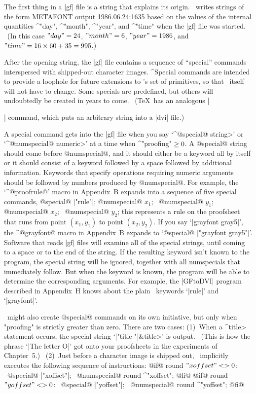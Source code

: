 \smallskip
The first thing in a |gf| file is a string that explains its origin.
\MF\ writes strings of the form
\begintt
METAFONT output 1986.06.24:1635
\endtt
based on the values of the internal quantities ^"day", ^"month",
^"year", and ^"time" when the |gf| file was started. \ (In this case
$"day"=24$, $"month"=6$, $"year"=1986$, %
and $"time"=16\times60+35=995$.)

After the opening string, the |gf| file contains a sequence of
``special'' commands interspersed with shipped-out character images.
^{Special commands} are intended to provide a loophole for future
extensions to \MF's set of primitives, so that \MF\ itself will not
have to change. Some specials are predefined, but others will
undoubtedly be created in years to come. \ (\TeX\ has an analogous
|\special| command, which puts an arbitrary string into a |dvi| file.)

A special command gets into the |gf| file when you say `^@special@
\<string>' or `^@numspecial@ \<numeric>' at a time when
^"proofing"$\null\ge0$.  A @special@ string should come before
@numspecial@, and it
should either be a keyword all by itself or it should consist of a keyword
followed by a space followed by additional information. Keywords that
specify operations requiring numeric arguments should be followed by
numbers produced by @numspecial@. For example, the `^@proofrule@' macro
in Appendix~B expands into a sequence of five special commands,
\begindisplay
@special@ |"rule"|;\cr
@numspecial@ $x_1$; \ @numspecial@ $y_1$;\cr
@numspecial@ $x_2$; \ @numspecial@ $y_2$;\cr
\enddisplay
this represents a rule on the proofsheet that runs from point $(x_1,y_1)$
to point $(x_2,y_2)$. If you say `|grayfont gray5|', the ^@grayfont@
macro in Appendix~B expands to `@special@ |"grayfont gray5"|'.
Software that reads |gf| files will examine all of the special strings,
until coming to a space or to the end of the string. If the resulting
keyword isn't known to the program, the special string will be ignored,
together with all numspecials that immediately follow. But when the
keyword is known, the program will be able to determine the corresponding
arguments.  For example, the |GFtoDVI| program described in Appendix~H
knows about the plain \MF\ keywords `|rule|' and `|grayfont|'.

\MF\ might also create @special@ commands on its own initiative, but only
when "proofing" is strictly greater than zero. There are
two cases: (1)~When a ^\<title> statement occurs,
the special string `|"title "|\thinspace\&\thinspace\<title>'
is output. \ (This is how the phrase `|The letter O|' got onto your
proofsheets in the experiments of Chapter~5.) \ (2)~Just before a
character image is shipped out, \MF\ implicitly executes the following
sequence of instructions:
\begindisplay
@if@ round $"xoffset"<>0$: \ @special@ |"xoffset"|; \
 @numspecial@ round ^"xoffset"; @fi@\cr
@if@ round $"yoffset"<>0$: \ @special@ |"yoffset"|; \
 @numspecial@ round ^"yoffset"; @fi@\cr
\enddisplay

